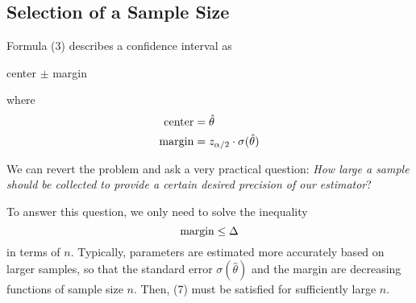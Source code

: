 \subsection{Selection of a Sample Size}
\label{subsec:selection-of-a-sample-size}

Formula (3) describes a confidence interval as
\begin{center}
  center $\pm$ margin
\end{center}
\noindent where
\begin{align*}
  \textnormal{center} &= \hat{\theta}\\
  \textnormal{margin} &= z_{\alpha / 2} \cdot \sigma(\hat{\theta})
\end{align*}

We can revert the problem and ask a very practical question: \textit{How large a sample should be collected to provide a certain desired precision of our estimator}?

To answer this question, we only need to solve the inequality
\begin{equation}
  \textnormal{margin} \leq \Delta
\end{equation}
in terms of $n$. Typically, parameters are estimated more accurately based on larger samples,
so that the standard error $\sigma(\hat{\theta})$ and the margin are decreasing functions of sample size $n$. Then, (7) must be satisfied for sufficiently large $n$.
